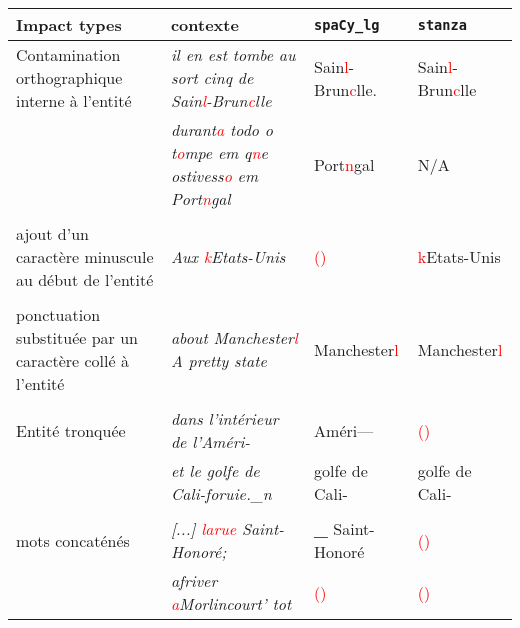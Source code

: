 \scriptsize{\begin{tabular}{|p{3.2cm}|p{4cm}|p{1.5cm}|p{1.3cm}|}

\hline


\bf{Impact types} & \bf {contexte} &  \bf{\texttt{spaCy\_lg}}&\bf{\texttt{stanza}}\\
\hline
 Contamination orthographique interne à l'entité& 
\textit{il en est tombe au sort cinq de Sain\textcolor{red}{l}-Brun\textcolor{red}{c}lle} & Sain\textcolor{red}{l}-Brun\textcolor{red}{c}lle. & Sain\textcolor{red}{l}-Brun\textcolor{red}{c}lle \\

&\textit{durant\textcolor{red}{a} todo o t\textcolor{red}{o}mpe
em q\textcolor{red}{n}e ostivess\textcolor{red}{o} em Port\textcolor{red}{n}gal}& Port\textcolor{red}{n}gal & N/A\\ 
&&  & \\
\rowcolor{lightgray}ajout d'un caractère minuscule au début de l'entité &\textit{Aux \textcolor{red}{k}Etats-Unis}& \textcolor{red}{()} & \textcolor{red}{k}Etats-Unis\\
&&  & \\
ponctuation substituée par un caractère collé à l'entité &\textit{about Manchester\textcolor{red}{l} A
pretty state}&Manchester\textcolor{red}{l}&Manchester\textcolor{red}{l}\\
&&  & \\
\rowcolor{lightgray}Entité tronquée &\textit{dans l'intérieur de l'Améri-} & Améri—& \textcolor{red}{()}\\
\rowcolor{lightgray}&\textit{et le golfe de Cali-foruie.\_n}&golfe de Cali-& golfe de Cali-\\
&&  & \\
mots concaténés & \textit{[...] \textcolor{red}{larue} Saint-Honoré;}& \textbf{\_} Saint-Honoré &  \textcolor{red}{()} \\
&\textit{afriver \textcolor{red}{a}Morlincourt' tot}& \textcolor{red}{()} & \textcolor{red}{()}\\



\hline
\end{tabular}}
